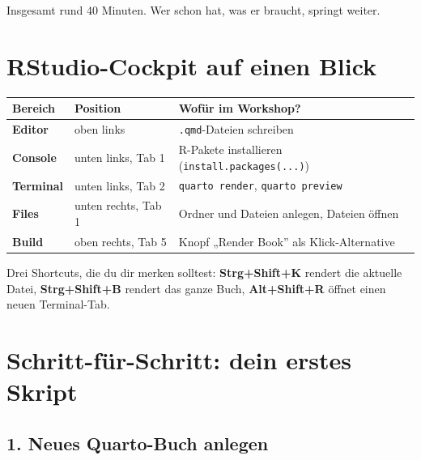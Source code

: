 \documentclass[
  ngerman,
  a4paper,
  DIV=11]{scrreprt}
\begin{document}
Insgesamt rund 40 Minuten. Wer schon hat, was er braucht, springt
weiter.

\section{RStudio-Cockpit auf einen
Blick}\label{rstudio-cockpit-auf-einen-blick}

\begin{longtable}[]{@{}
  >{\raggedright\arraybackslash}p{}
  >{\raggedright\arraybackslash}p{}
  >{\raggedright\arraybackslash}p{}@{}}
\toprule\noalign{}
\begin{minipage}[b]{\linewidth}\raggedright
Bereich
\end{minipage} & \begin{minipage}[b]{\linewidth}\raggedright
Position
\end{minipage} & \begin{minipage}[b]{\linewidth}\raggedright
Wofür im Workshop?
\end{minipage} \\
\midrule\noalign{}
\endhead
\bottomrule\noalign{}
\endlastfoot
\textbf{Editor} & oben links & \texttt{.qmd}-Dateien schreiben \\
\textbf{Console} & unten links, Tab 1 & R-Pakete installieren
(\texttt{install.packages(...)}) \\
\textbf{Terminal} & unten links, Tab 2 & \texttt{quarto\ render},
\texttt{quarto\ preview} \\
\textbf{Files} & unten rechts, Tab 1 & Ordner und Dateien anlegen,
Dateien öffnen \\
\textbf{Build} & oben rechts, Tab 5 & Knopf „Render Book'' als
Klick-Alternative \\
\end{longtable}

Drei Shortcuts, die du dir merken solltest: \textbf{Strg+Shift+K}
rendert die aktuelle Datei, \textbf{Strg+Shift+B} rendert das ganze
Buch, \textbf{Alt+Shift+R} öffnet einen neuen Terminal-Tab.

\section{Schritt-für-Schritt: dein erstes
Skript}\label{schritt-fuxfcr-schritt-dein-erstes-skript}

\subsection{1. Neues Quarto-Buch
anlegen}\label{neues-quarto-buch-anlegen}
\end{document}
